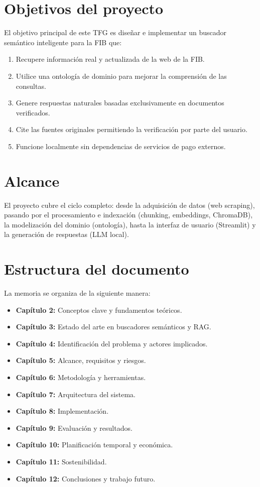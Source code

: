 \documentclass[12pt, a4paper, twoside]{report}
\begin{document}
\section{Objetivos del proyecto}

El objetivo principal de este TFG es dise\~nar e implementar un buscador sem\'antico inteligente para la FIB que:

\begin{enumerate}
  \item Recupere informaci\'on real y actualizada de la web de la FIB.
  \item Utilice una ontolog\'ia de dominio para mejorar la comprensi\'on de las consultas.
  \item Genere respuestas naturales basadas exclusivamente en documentos verificados.
  \item Cite las fuentes originales permitiendo la verificaci\'on por parte del usuario.
  \item Funcione localmente sin dependencias de servicios de pago externos.
\end{enumerate}

\section{Alcance}

El proyecto cubre el ciclo completo: desde la adquisici\'on de datos (web scraping), pasando por el procesamiento e indexaci\'on (chunking, embeddings, ChromaDB), la modelizaci\'on del dominio (ontolog\'ia), hasta la interfaz de usuario (Streamlit) y la generaci\'on de respuestas (LLM local).

\section{Estructura del documento}

La memoria se organiza de la siguiente manera:

\begin{itemize}
  \item \textbf{Cap\'itulo 2:} Conceptos clave y fundamentos te\'oricos.
  \item \textbf{Cap\'itulo 3:} Estado del arte en buscadores sem\'anticos y RAG.
  \item \textbf{Cap\'itulo 4:} Identificaci\'on del problema y actores implicados.
  \item \textbf{Cap\'itulo 5:} Alcance, requisitos y riesgos.
  \item \textbf{Cap\'itulo 6:} Metodolog\'ia y herramientas.
  \item \textbf{Cap\'itulo 7:} Arquitectura del sistema.
  \item \textbf{Cap\'itulo 8:} Implementaci\'on.
  \item \textbf{Cap\'itulo 9:} Evaluaci\'on y resultados.
  \item \textbf{Cap\'itulo 10:} Planificaci\'on temporal y econ\'omica.
  \item \textbf{Cap\'itulo 11:} Sostenibilidad.
  \item \textbf{Cap\'itulo 12:} Conclusiones y trabajo futuro.
\end{itemize}
\end{document}
